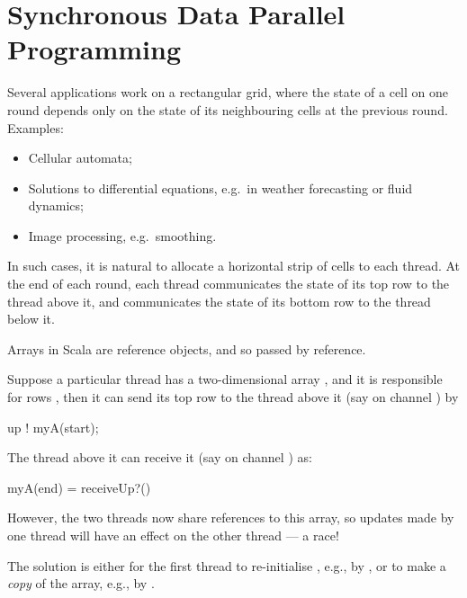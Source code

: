 \chapter{Synchronous Data Parallel Programming}
\label{chap:dataParallel}






\begin{slide}

Several applications work on a rectangular grid, where the state of a cell on
one round depends only on the state of its neighbouring cells at the previous
round.  Examples:
%
\begin{itemize}
\item
Cellular automata;

\item
Solutions to differential equations, e.g.~in weather forecasting or fluid
dynamics;

\item Image processing, e.g.~smoothing.
\end{itemize}

In such cases, it is natural to allocate a horizontal strip of cells to each
thread.  At the end of each round, each thread communicates the state of its
top row to the thread above it, and communicates the state of its bottom row
to the thread below it.  

\end{slide}


\begin{slide}

Arrays in Scala are reference objects, and so passed by reference.  

Suppose a particular thread has a two-dimensional array , and it
is responsible for rows \SCALA{[start..end)}, then it can send its top row to
the thread above it (say on channel ) by
%
\begin{scala}
up ! myA(start);
\end{scala}
%
The thread above it can receive it (say on channel ) as:
%
\begin{scala}
myA(end) = receiveUp?()
\end{scala}
%
However, the two threads now share references to this array, so updates made
by one thread will have an effect on the other thread --- a race!

The solution is either for the first thread to re-initialise
, e.g., by , or to
make a \emph{copy} of the array, e.g., by .
\end{slide}


